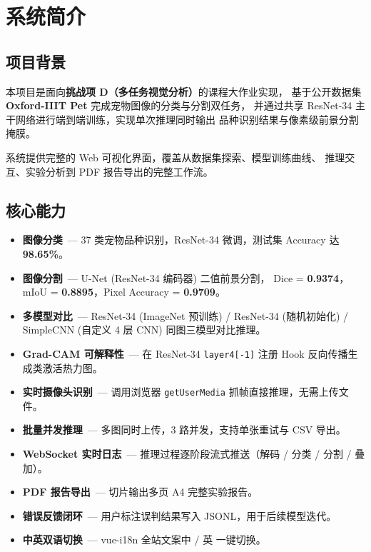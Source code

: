 \documentclass[12pt, a4paper, openany]{ctexbook}
\begin{document}
\chapter{系统简介}

\section{项目背景}

本项目是面向\textbf{挑战项 D（多任务视觉分析）}的课程大作业实现，
基于公开数据集 \textbf{Oxford-IIIT Pet} 完成宠物图像的分类与分割双任务，
并通过共享 ResNet-34 主干网络进行端到端训练，实现单次推理同时输出
品种识别结果与像素级前景分割掩膜。

系统提供完整的 Web 可视化界面，覆盖从数据集探索、模型训练曲线、
推理交互、实验分析到 PDF 报告导出的完整工作流。

\section{核心能力}

\begin{itemize}[leftmargin=*]
  \item \textbf{图像分类}\ — 37 类宠物品种识别，ResNet-34 微调，测试集 Accuracy 达 \textbf{98.65\%}。
  \item \textbf{图像分割}\ — U-Net (ResNet-34 编码器) 二值前景分割，
        Dice = \textbf{0.9374}，mIoU = \textbf{0.8895}，Pixel Accuracy = \textbf{0.9709}。
  \item \textbf{多模型对比}\ — ResNet-34 (ImageNet 预训练) / ResNet-34 (随机初始化) /
        SimpleCNN (自定义 4 层 CNN) 同图三模型对比推理。
  \item \textbf{Grad-CAM 可解释性}\ — 在 ResNet-34 \texttt{layer4[-1]} 注册 Hook 反向传播生成类激活热力图。
  \item \textbf{实时摄像头识别}\ — 调用浏览器 \texttt{getUserMedia} 抓帧直接推理，无需上传文件。
  \item \textbf{批量并发推理}\ — 多图同时上传，3 路并发，支持单张重试与 CSV 导出。
  \item \textbf{WebSocket 实时日志}\ — 推理过程逐阶段流式推送（解码 / 分类 / 分割 / 叠加）。
  \item \textbf{PDF 报告导出}\ — 切片输出多页 A4 完整实验报告。
  \item \textbf{错误反馈闭环}\ — 用户标注误判结果写入 JSONL，用于后续模型迭代。
  \item \textbf{中英双语切换}\ — vue-i18n 全站文案中 / 英 一键切换。
\end{itemize}
\end{document}
